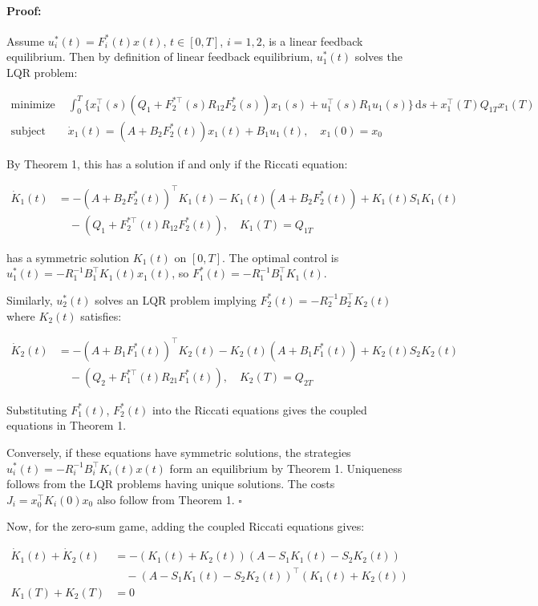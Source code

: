 \documentclass[3p]{elsarticle}
\newenvironment{proof}{\paragraph{Proof:}}{\hfill$\square$}
\begin{document}
\begin{proof}
Assume $u_i^*(t) = F_i^*(t) x(t)$, $t \in [0,T]$, $i=1,2$, is a linear feedback equilibrium. Then by definition of linear feedback equilibrium, $u_1^*(t)$ solves the LQR problem:

\begin{align*}
\text{minimize } & \int_0^T \{ x_1^\top(s) (Q_1 + F_{2}^{*\top}(s)R_{12}F_2^*(s)) x_1(s) + u_1^\top(s) R_1 u_1(s) \}\,\mathrm{d}s + x_1^\top(T) Q_{1T} x_1(T) \\
\text{subject to } & \dot{x}_1(t) = (A + B_2 F_2^*(t)) x_1(t) + B_1 u_1(t), \quad x_1(0) = x_0
\end{align*}

By Theorem 1, this has a solution if and only if the Riccati equation:

\begin{align*}
\dot{K}_1(t) &= -(A+B_2F_2^*(t))^\top K_1(t) - K_1(t)(A+B_2F_2^*(t)) + K_1(t)S_1K_1(t) \\
&\quad - (Q_1 + F_{2}^{*\top}(t)R_{12}F_2^*(t)), \quad K_1(T) = Q_{1T}  
\end{align*}

has a symmetric solution $K_1(t)$ on $[0,T]$. The optimal control is $u_1^*(t) = -R_1^{-1}B_1^\top K_1(t) x_1(t)$, so $F_1^*(t) = -R_1^{-1}B_1^\top K_1(t)$.

Similarly, $u_2^*(t)$ solves an LQR problem implying $F_2^*(t) = -R_2^{-1}B_2^\top K_2(t)$ where $K_2(t)$ satisfies: 

\begin{align*}
\dot{K}_2(t) &= -(A+B_1F_1^*(t))^\top K_2(t) - K_2(t)(A+B_1F_1^*(t)) + K_2(t)S_2K_2(t) \\  
&\quad - (Q_2 + F_{1}^{*\top}(t)R_{21}F_1^*(t)), \quad K_2(T) = Q_{2T}
\end{align*}

Substituting $F_1^*(t)$, $F_2^*(t)$ into the Riccati equations gives the coupled equations in Theorem 1.

Conversely, if these equations have symmetric solutions, the strategies $u_i^*(t) = -R_i^{-1}B_i^\top K_i(t) x(t)$ form an equilibrium by Theorem 1. Uniqueness follows from the LQR problems having unique solutions. The costs $J_i = x_0^\top K_i(0) x_0$ also follow from Theorem 1.
\end{proof}

Now, for the zero-sum game, adding the coupled Riccati equations gives:

\begin{align*}
\dot{K}_1(t) + \dot{K}_2(t) &= -(K_1(t) + K_2(t))(A - S_1K_1(t) - S_2K_2(t)) \\  
&\quad - (A - S_1K_1(t) - S_2K_2(t))^\top(K_1(t) + K_2(t)) \\
K_1(T) + K_2(T) &= 0
\end{align*}
\end{document}
